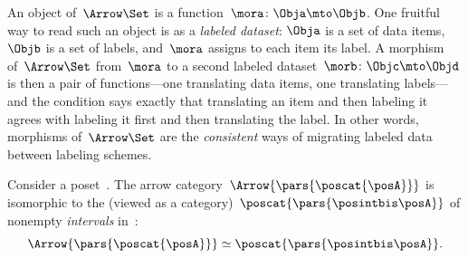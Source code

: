 \begin{example}
    \label{exa:arrow-set}
    An object of~$\Arrow\Set$ is a function~$\mora \colon \Obja \mto \Objb$.
    One fruitful way to read such an object is as a \emph{labeled dataset}: $\Obja$ is a set of data items, $\Objb$ is a set of labels, and~$\mora$ assigns to each item its label.
    A morphism of~$\Arrow\Set$ from~$\mora$ to a second labeled dataset~$\morb \colon \Objc \mto \Objd$ is then a pair of functions---one translating data items, one translating labels---and the  condition says exactly that translating an item and then labeling it agrees with labeling it first and then translating the label.
    In other words, morphisms of~$\Arrow\Set$ are the \emph{consistent} ways of migrating labeled data between labeling schemes.
\end{example}

\begin{example}[Intervals]
    \label{exa:arrow-poset}
    Consider a poset~\posA.
    The arrow category~$\Arrow{\pars{\poscat{\posA}}}$ is isomorphic to the  (viewed as a category)~$\poscat{\pars{\posintbis\posA}}$ of nonempty \emph{intervals} in~\posA:
    \begin{equation}
        \Arrow{\pars{\poscat{\posA}}} \simeq
        \poscat{\pars{\posintbis\posA}}.
    \end{equation}
\end{example}


